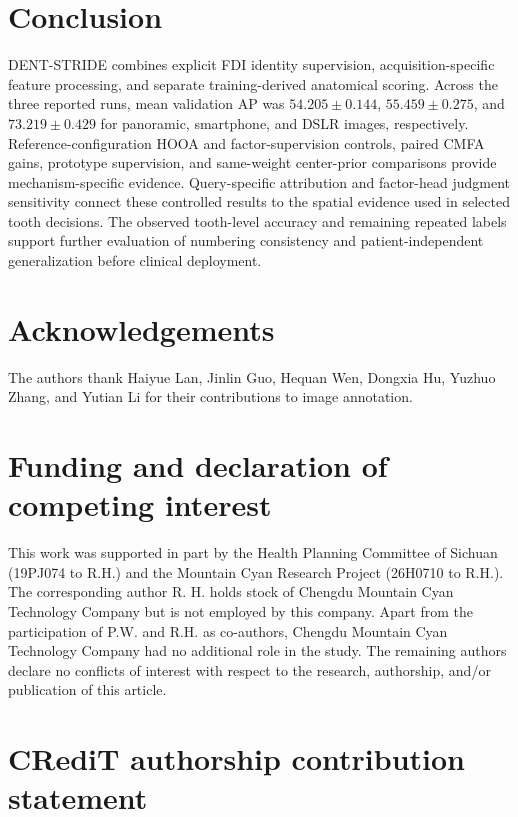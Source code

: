 \documentclass[a4paper,fleqn]{cas-dc}
\begin{document}
\FloatBarrier

\section{Conclusion}
\label{sec:conclusion}

DENT-STRIDE combines explicit FDI identity supervision, acquisition-specific feature processing, and separate training-derived anatomical scoring. Across the three reported runs, mean validation AP was $54.205\pm0.144$, $55.459\pm0.275$, and $73.219\pm0.429$ for panoramic, smartphone, and DSLR images, respectively. Reference-configuration HOOA and factor-supervision controls, paired CMFA gains, prototype supervision, and same-weight center-prior comparisons provide mechanism-specific evidence. Query-specific attribution and factor-head judgment sensitivity connect these controlled results to the spatial evidence used in selected tooth decisions. The observed tooth-level accuracy and remaining repeated labels support further evaluation of numbering consistency and patient-independent generalization before clinical deployment.



\section*{Acknowledgements}

The authors thank Haiyue Lan, Jinlin Guo, Hequan Wen, Dongxia Hu, Yuzhuo Zhang, and Yutian Li for their contributions to image annotation.

\section*{Funding and declaration of competing interest}

This work was supported in part by the Health Planning Committee of Sichuan (19PJ074 to R.H.) and the Mountain Cyan Research Project (26H0710 to R.H.). The corresponding author R. H. holds stock of Chengdu Mountain Cyan Technology Company but is not employed by this company. Apart from the participation of P.W. and R.H. as co-authors, Chengdu Mountain Cyan Technology Company had no additional role in the study. The remaining authors declare no conflicts of interest with respect to the research, authorship, and/or publication of this article.

\section*{CRediT authorship contribution statement}
\end{document}
